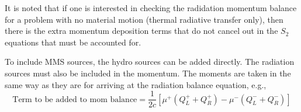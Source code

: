 It is noted that if one is interested in checking the radidation momentum balance for
a problem with no material motion (thermal radiative transfer only), then there is
the extra momentum deposition terms that do not cancel out in the $S_2$ equations
that must be accounted for.

To include MMS sources, the hydro sources can be added directly.  The radiation
sources must also be included in the momentum.  The moments are taken in the same way
as they are for arriving at the radiation balance equation, e.g.,
\begin{equation*}
    \text{Term to be added to mom balance} = \frac{1}{2c}[\mu^+(Q_L^+ + Q_R^+) -
    \mu^-(Q_L^- + Q_R^-)]
\end{equation*}



